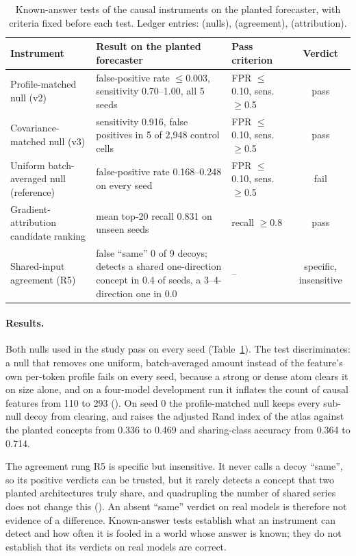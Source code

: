 \begin{table}[!tb]
\centering
\footnotesize
\setlength{\tabcolsep}{4pt}
\begin{tabularx}{\textwidth}{@{}>{\raggedright}p{4.6cm}>{\raggedright}X>{\raggedright}p{3.2cm}c@{}}
\toprule
Instrument & Result on the planted forecaster & Pass criterion & Verdict \\
\midrule
Profile-matched null (v2) & false-positive rate $\le$0.003, sensitivity 0.70--1.00, all 5 seeds & FPR $\le$0.10, sens.\ $\ge$0.5 & pass \\
Covariance-matched null (v3) & sensitivity 0.916, false positives in 5 of 2{,}948 control cells & FPR $\le$0.10, sens.\ $\ge$0.5 & pass \\
Uniform batch-averaged null (reference) & false-positive rate 0.168--0.248 on every seed & FPR $\le$0.10, sens.\ $\ge$0.5 & fail \\
Gradient-attribution candidate ranking & mean top-20 recall 0.831 on unseen seeds & recall $\ge$0.8 & pass \\
Shared-input agreement (R5) & false ``same'' 0 of 9 decoys; detects a shared one-direction concept in 0.4 of seeds, a 3--4-direction one in 0.0 & -- & specific, insensitive \\
\bottomrule
\end{tabularx}
\caption{Known-answer tests of the causal instruments on the planted forecaster, with criteria fixed before each test.
Ledger entries:  (nulls),  (agreement),  (attribution).}
\label{tab:knownanswer}
\end{table}

\paragraph{Results.} Both nulls used in the study pass on every seed (Table~\ref{tab:knownanswer}). The test
discriminates: a null that removes one uniform, batch-averaged amount instead of the feature's own per-token profile
fails on every seed, because a strong or dense atom clears it on size alone, and on a four-model development run it
inflates the count of causal features from 110 to 293 (). On seed 0 the profile-matched null keeps every
sub-null decoy from clearing, and raises the adjusted Rand index of the atlas against the planted concepts from 0.336 to
0.469 and sharing-class accuracy from 0.364 to 0.714.

The agreement rung R5 is specific but insensitive. It never calls a decoy ``same'', so its positive verdicts can be
trusted, but it rarely detects a concept that two planted architectures truly share, and quadrupling the number of shared
series does not change this (). An absent ``same'' verdict on real models is therefore not evidence of a
difference. Known-answer tests establish what an instrument can detect and how often it is fooled in a world whose
answer is known; they do not establish that its verdicts on real models are correct.
